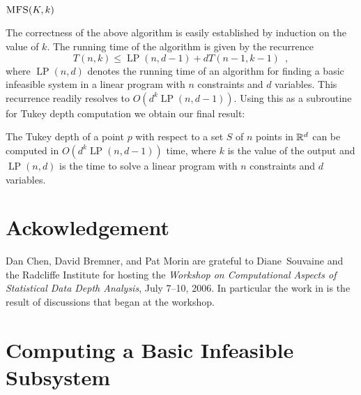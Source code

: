 \documentclass[charterfonts,lotsofwhite]{patmorin}
\DeclareMathOperator{\lp}{LP}
\begin{document}
\noindent$\textsc{MFS}(K,k)$
\begin{algorithmic}[1]
\ENDIF
{}
\ENDIF
{}
   \ENDIF
\ENDFOR
{}
\end{algorithmic}

The correctness of the above algorithm is easily established by
induction on the value of $k$.  The running time of the algorithm is
given by the recurrence
\[
    T(n,k) \le \lp(n,d-1)+ dT(n-1,k-1) \enspace ,
\]
where $\lp(n,d)$ denotes the running time of an algorithm for finding
a basic infeasible system in a linear program with $n$ constraints and
$d$ variables.  This recurrence readily resolves to
$O(d^k\lp(n,d-1))$.  
Using this as a subroutine for Tukey depth computation we obtain our
final result:

\begin{thm}
The Tukey depth of a point $p$ with respect to a set $S$ of $n$ points
in $\mathbb{R}^d$ can be computed in $O(d^k\lp(n,d-1))$ time, where $k$ is
the value of the output and $\lp(n,d)$ is the time to solve a linear
program with $n$ constraints and $d$ variables.
\end{thm}

\section*{Ackowledgement}

Dan Chen, David Bremner, and Pat Morin are grateful to Diane~Souvaine
and the Radcliffe Institute for hosting the \emph{Workshop on
Computational Aspects of Statistical Data Depth Analysis}, July 7--10,
2006.  In particular the work in  is the result of
discussions that began at the workshop.




\appendix
\section{Computing a Basic Infeasible Subsystem}
\end{document}
